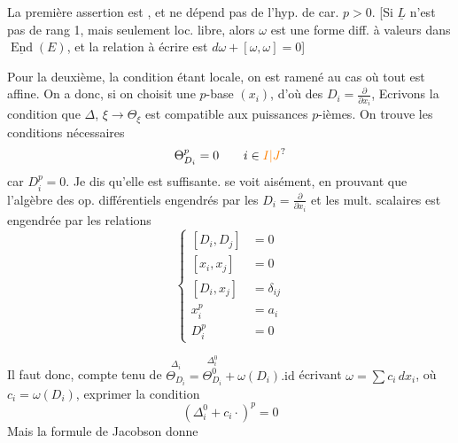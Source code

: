 La première assertion est , et ne dépend pas de l'hyp. de car. $p>0$. [Si $\underline L$ n'est pas de rang 1, mais seulement loc. libre, alors $\omega$ est une forme diff. à valeurs dans $\underline{\operatorname{End}}(E)$, et la relation à écrire est $d\omega+[\omega,\omega]=0$]


Pour la deuxième, la condition étant locale, on est ramené au cas où tout est affine. On a donc, si on choisit une $p$-base $(x_i)$, d'où des $D_i=\frac{\partial}{\partial x_i}$,
 Ecrivons la condition que $\Delta$,  $\xi\longrightarrow\Theta_\xi$  est compatible aux puissances $p$-ièmes. On trouve  les conditions nécessaires
\[
 \Theta_{D_i}^{p}=0\qquad i\in \unsure{I|J}
\]
car $D_i^p=0$. Je dis qu'elle est suffisante.  se voit aisément, en prouvant que l'algèbre des  op. différentiels engendrés par les $D_i=\frac{\partial}{\partial x_i}$ et les mult.  scalaires est engendrée par  les relations
\[
 \left\{\begin{aligned}
 [D_i,D_j]&=0\\
 [x_i,x_j]&=0\\
 [D_i,x_j]&=\delta_{ij}\\
 x_i^p&=a_i\\
 D_i^p&=0
 \end{aligned}\right.
\]

Il faut donc, compte tenu de $\overset{\Delta_i}{\Theta_{D_i}}=\overset{\Delta_i^0}{\Theta^0_{D_i}}+\omega(D_i).\mathrm{id}$ écrivant $\omega=\sum c_i\,dx_i$, où $c_i=\omega(D_i)$, exprimer la condition
\[
 (\Delta_i^0+c_i\cdot)^p=0
\]
Mais la formule de Jacobson donne

